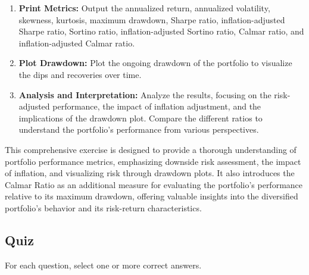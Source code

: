 \documentclass{article}
\begin{document}
\begin{enumerate}
    \item \textbf{Print Metrics:} Output the annualized return, annualized volatility, skewness, kurtosis, maximum drawdown, Sharpe ratio, inflation-adjusted Sharpe ratio, Sortino ratio, inflation-adjusted Sortino ratio, Calmar ratio, and inflation-adjusted Calmar ratio.
    
    \item \textbf{Plot Drawdown:} Plot the ongoing drawdown of the portfolio to visualize the dips and recoveries over time.
    
    \item \textbf{Analysis and Interpretation:} Analyze the results, focusing on the risk-adjusted performance, the impact of inflation adjustment, and the implications of the drawdown plot. Compare the different ratios to understand the portfolio's performance from various perspectives.
\end{enumerate}

This comprehensive exercise is designed to provide a thorough understanding of portfolio performance metrics, emphasizing downside risk assessment, the impact of inflation, and visualizing risk through drawdown plots. It also introduces the Calmar Ratio as an additional measure for evaluating the portfolio's performance relative to its maximum drawdown, offering valuable insights into the diversified portfolio's behavior and its risk-return characteristics.

\subsection{Quiz}
For each question, select one or more correct answers.
\end{document}
